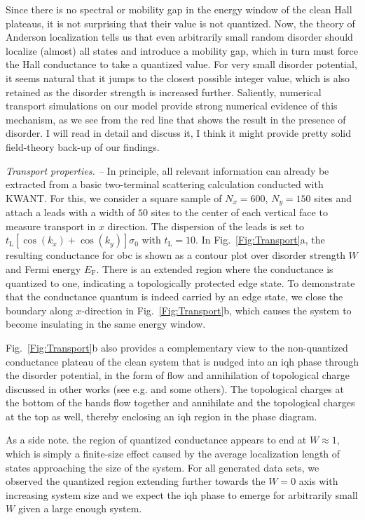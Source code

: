 \documentclass[aps,prl,amsmath,amssymb,twocolumn]{revtex4-2}
\newcommand{\BM}[1]{{\color{orange} #1}}
\begin{document}
Since there is no spectral or mobility gap in the energy window of the clean Hall plateaus, it is not surprising that their value is not quantized. Now, the theory of Anderson localization tells us that even arbitrarily small random disorder should localize (almost) all states and introduce a mobility gap, which in turn must force the Hall conductance to take a quantized value. For very small disorder potential, it seems natural that it jumps to the closest possible integer value, which is also retained as the disorder strength is increased further. Saliently, numerical transport simulations on our model provide strong numerical evidence of this mechanism, as we see from the red line that shows the result in the presence of disorder. \BM{I will read \cite{field_theory_disordered_CI} in detail and discuss it, I think it might provide pretty solid field-theory back-up of our findings.}

{\it Transport properties. --} 
In principle, all relevant information can already be extracted from a basic two-terminal scattering calculation conducted with KWANT. For this, we consider a square sample of $N_x = 600$, $N_y = 150$ sites and attach a leads with a width of $50$ sites to the center of each vertical face to measure transport in $x$ direction. The dispersion of the leads is set to $t_\mathrm{L} [\cos(k_x)  + \cos(k_y)] \sigma_0$ with $t_\mathrm{L} = 10$. In Fig.~\ref{Fig:Transport}a, the resulting conductance for \gls{obc} is shown as a contour plot over disorder strength $W$ and Fermi energy $E_\mathrm{F}$. There is an extended region where the conductance is quantized to one, indicating a topologically protected edge state. To demonstrate that the conductance quantum is indeed carried by an edge state, we close the boundary along $x$-direction in Fig.~\ref{Fig:Transport}b, which causes the system to become insulating in the same energy window. 

Fig.~\ref{Fig:Transport}b also provides a complementary view to the non-quantized conductance plateau of the clean system that is nudged into an \gls{iqh} phase through the disorder potential, in the form of flow and annihilation of topological charge discussed in other works (see e.g. \cite{Fulga_Bergholtz} and some others). The topological charges at the bottom of the bands flow together and annihilate and the topological charges at the top as well, thereby enclosing an \gls{iqh} region in the phase diagram.

As a side note. the region of quantized conductance appears to end at $W \approx 1$, which is simply a finite-size effect caused by the average localization length of states approaching the size of the system. For all generated data sets, we observed the quantized region extending further towards the $W = 0$ axis with increasing system size and we expect the \gls{iqh} phase to emerge for arbitrarily small $W$ given a large enough system.
\end{document}
